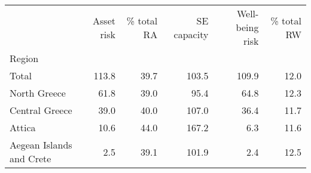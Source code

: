 \begin{tabular}{lrrrrr}
\toprule
{} &  Asset risk &  \% total RA &  SE capacity &  Well-being risk &  \% total RW \\
Region                   &             &             &              &                  &             \\
\midrule
Total                    &       113.8 &        39.7 &        103.5 &            109.9 &        12.0 \\
North Greece             &        61.8 &        39.0 &         95.4 &             64.8 &        12.3 \\
Central Greece           &        39.0 &        40.0 &        107.0 &             36.4 &        11.7 \\
Attica                   &        10.6 &        44.0 &        167.2 &              6.3 &        11.6 \\
Aegean Islands and Crete &         2.5 &        39.1 &        101.9 &              2.4 &        12.5 \\
\bottomrule
\end{tabular}
